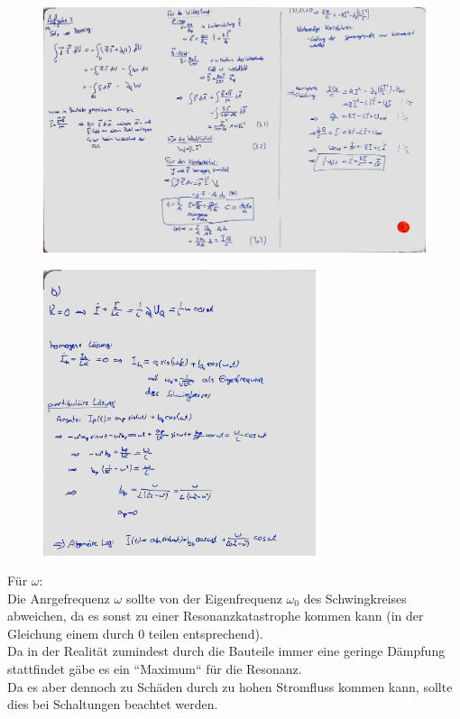 \documentclass[11pt a4paper]{article}
\begin{document}
\newpage

\begin{figure}[H]
	\centering
	\includegraphics[width=18cm]{3a.jpg}
\end{figure}

\begin{figure}
	\centering
	\includegraphics[width=8cm]{3b.jpg}
\end{figure}
Für $\omega$: \\
Die Anrgefrequenz $\omega$ sollte von der Eigenfrequenz $\omega_0$ des Schwingkreises abweichen, da es sonst 
zu einer Resonanzkatastrophe kommen kann (in der Gleichung einem durch 0 teilen entsprechend). \\
Da in der Realität zumindest durch die Bauteile immer eine geringe Dämpfung stattfindet gäbe es ein 
``Maximum`` für die Resonanz. \\
Da es aber dennoch zu Schäden durch zu hohen Stromfluss kommen kann, sollte dies bei Schaltungen beachtet werden.
\end{document}
